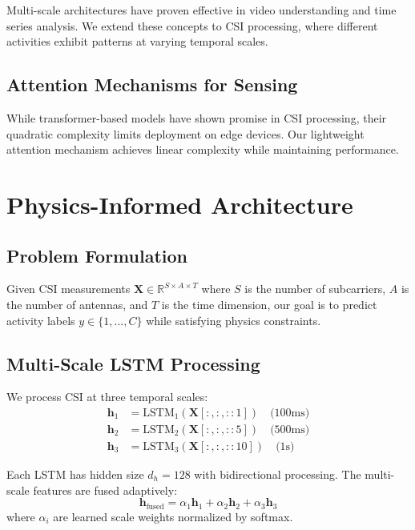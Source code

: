 \documentclass[10pt,conference]{IEEEtran}
\begin{document}
Multi-scale architectures have proven effective in video understanding and time series analysis. We extend these concepts to CSI processing, where different activities exhibit patterns at varying temporal scales.

\subsection{Attention Mechanisms for Sensing}

While transformer-based models have shown promise in CSI processing, their quadratic complexity limits deployment on edge devices. Our lightweight attention mechanism achieves linear complexity while maintaining performance.

\section{Physics-Informed Architecture}
\label{sec:architecture}

\subsection{Problem Formulation}

Given CSI measurements $\mathbf{X} \in \mathbb{R}^{S \times A \times T}$ where $S$ is the number of subcarriers, $A$ is the number of antennas, and $T$ is the time dimension, our goal is to predict activity labels $y \in \{1, ..., C\}$ while satisfying physics constraints.

\subsection{Multi-Scale LSTM Processing}

We process CSI at three temporal scales:
\begin{align}
    \mathbf{h}_1 &= \text{LSTM}_1(\mathbf{X}[:, :, ::1]) \quad \text{(100ms)} \\
    \mathbf{h}_2 &= \text{LSTM}_2(\mathbf{X}[:, :, ::5]) \quad \text{(500ms)} \\
    \mathbf{h}_3 &= \text{LSTM}_3(\mathbf{X}[:, :, ::10]) \quad \text{(1s)}
\end{align}

Each LSTM has hidden size $d_h = 128$ with bidirectional processing. The multi-scale features are fused adaptively:
\begin{equation}
    \mathbf{h}_{\text{fused}} = \alpha_1 \mathbf{h}_1 + \alpha_2 \mathbf{h}_2 + \alpha_3 \mathbf{h}_3
\end{equation}
where $\alpha_i$ are learned scale weights normalized by softmax.
\end{document}
